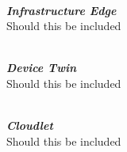 \vspace{0.5mm} \ \\
\textbf{\textit{Infrastructure Edge}}\\
Should this be included

\vspace{0.5mm} \ \\
\textbf{\textit{Device Twin}}\\
Should this be included

\vspace{0.5mm} \ \\
\textbf{\textit{Cloudlet}}\\
Should this be included


